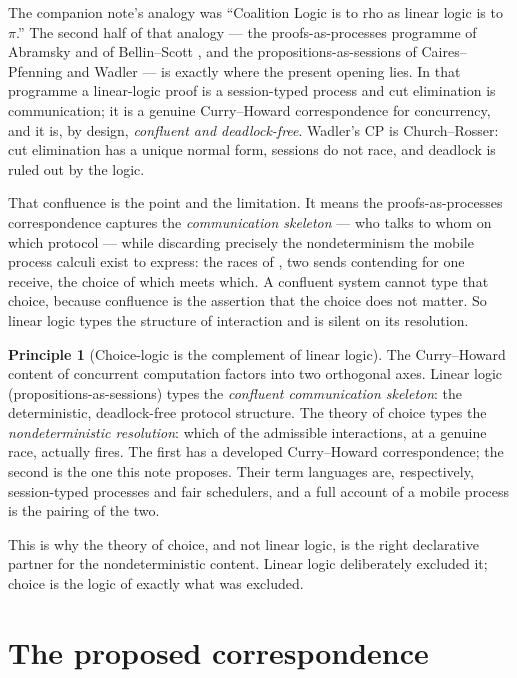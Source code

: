 \documentclass[11pt]{article}
\theoremstyle{definition}
\newtheorem{principle}{Principle}
\theoremstyle{plain}
\theoremstyle{remark}
\begin{document}
The companion note's analogy was ``Coalition Logic is to rho as linear logic is to $\pi$.'' The second
half of that analogy --- the proofs-as-processes programme of Abramsky and of Bellin--Scott
\cite{abramsky,bellinscott}, and the propositions-as-sessions of Caires--Pfenning and Wadler
\cite{cairespfenning,wadler} --- is exactly where the present opening lies. In that programme a
linear-logic proof is a session-typed process and cut elimination is communication; it is a genuine
Curry--Howard correspondence for concurrency, and it is, by design, \emph{confluent and deadlock-free}.
Wadler's CP is Church--Rosser: cut elimination has a unique normal form, sessions do not race, and
deadlock is ruled out by the logic.

That confluence is the point and the limitation. It means the proofs-as-processes correspondence captures
the \emph{communication skeleton} --- who talks to whom on which protocol --- while discarding precisely
the nondeterminism the mobile process calculi exist to express: the races of \cite{agency}, two sends
contending for one receive, the choice of which meets which. A confluent system cannot type that choice,
because confluence is the assertion that the choice does not matter. So linear logic types the structure
of interaction and is silent on its resolution.

\begin{principle}[Choice-logic is the complement of linear logic]\label{prin:complement}
The Curry--Howard content of concurrent computation factors into two orthogonal axes. Linear logic
(propositions-as-sessions) types the \emph{confluent communication skeleton}: the deterministic,
deadlock-free protocol structure. The theory of choice types the \emph{nondeterministic resolution}:
which of the admissible interactions, at a genuine race, actually fires. The first has a developed
Curry--Howard correspondence; the second is the one this note proposes. Their term languages are,
respectively, session-typed processes and fair schedulers, and a full account of a mobile process is
the pairing of the two.
\end{principle}

\noindent
This is why the theory of choice, and not linear logic, is the right declarative partner for the
nondeterministic content. Linear logic deliberately excluded it; choice is the logic of exactly what
was excluded.

\section{The proposed correspondence}\label{sec:corr}
\end{document}
